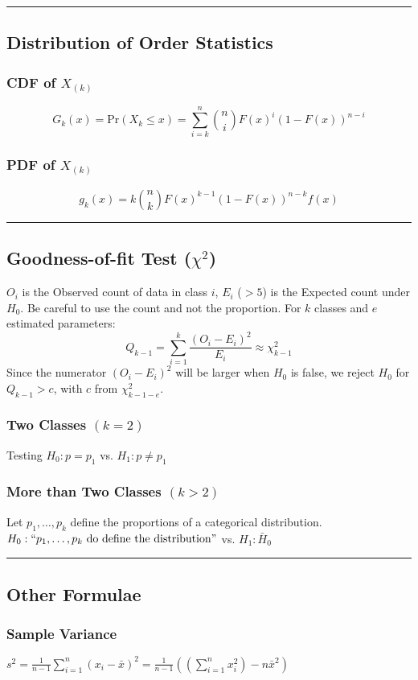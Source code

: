 \documentclass{article}
\begin{document}
\begin{multicols*}{2}
\noindent\rule{\linewidth}{0.25pt}
\subsection*{Distribution of Order Statistics}
\subsubsection*{CDF of $X_{(k)}$}
$$G_{k}(x) = \mbox{Pr}(X_{k} \leq x) = \sum_{i=k}^{n} \binom{n}{i} F(x)^{i} (1 - F(x))^{n-i}$$
\subsubsection*{PDF of $X_{(k)}$}
$$g_{k}(x) = k \binom{n}{k} F(x)^{k-1} (1 - F(x))^{n-k} f(x)$$


\noindent\rule{\linewidth}{0.25pt}
\subsection*{Goodness-of-fit Test ($\chi^{2}$)}
$O_{i}$ is the Observed count of data in class $i$, $E_{i}$ {\color{red} ($> 5$)} is the Expected count under $H_{0}$. Be careful to use the count and not the proportion. For $k$ classes and $e$ estimated parameters:
$$Q_{k-1} = \sum_{i=1}^{k} \frac{(O_{i} - E_{i})^{2}}{E_{i}} \approx \chi^{2}_{k-1}$$
Since the numerator $(O_{i} - E_{i})^{2}$ will be larger when $H_{0}$ is false, we reject $H_{0}$ for $Q_{k-1} > c$, with $c$ from $\chi^{2}_{k-1-e}$.
\subsubsection*{Two Classes $(k = 2)$}
Testing $H_{0}: p = p_{1}$ vs. $H_{1}: p \neq p_{1}$
\subsubsection*{More than Two Classes $(k > 2)$}
Let $p_{1}, \dots, p_{k}$ define the proportions of a categorical distribution. $H_{0}: ``p_{1}, \dots, p_{k} \mbox{ do define the distribution}"$ vs. $H_{1}: \bar{H}_{0}$

\noindent\rule{\linewidth}{0.25pt}
\subsection*{Other Formulae}
\subsubsection*{Sample Variance}
$s^2 = \frac{1}{n-1} \sum_{i=1}^{n} (x_{i}-\bar{x})^2 = \frac{1}{n-1} \left( \left( \sum_{i=1}^{n} x_{i}^2 \right) -n \bar{x}^2 \right)$

\end{multicols*}
\end{document}
